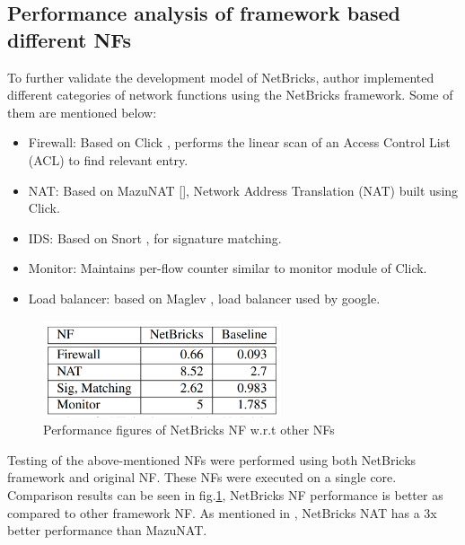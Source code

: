 \documentclass[10pt, a4paper, conference]{IEEEtran}
\begin{document}
\subsection{Performance analysis of framework based different NFs}
To further validate the development model of NetBricks, author implemented different categories of network functions using the NetBricks framework. Some of them are mentioned below\cite{Panda2016}:
\begin{itemize}
\item Firewall: Based on Click \cite{Martins2014}, performs the linear scan of an Access Control List (ACL) to find relevant entry.
\item NAT: Based on MazuNAT [], Network Address Translation (NAT) built using Click.
\item IDS: Based on Snort \cite{Roesch}, for signature matching.
\item Monitor: Maintains per-flow counter similar to monitor module of Click.
\item Load balancer: based on Maglev\cite{Yaghoubi2012} , load balancer used by google.
\end{itemize}
\begin{figure}
	\centering
	\includegraphics[width=70mm]{figures/tab1}
	\caption{Performance figures of NetBricks NF w.r.t other NFs\cite{Panda2016}}
	
	\label{key6}
\end{figure}

Testing of the above-mentioned NFs were performed using both NetBricks framework and original NF. These NFs were executed on a single core\cite{Panda2016}. Comparison results can be seen in fig.\ref{key6}, NetBricks NF performance is better as compared to other framework NF. As mentioned in \cite{Panda2016}, NetBricks NAT has a 3x better performance than MazuNAT. 
\end{document}
